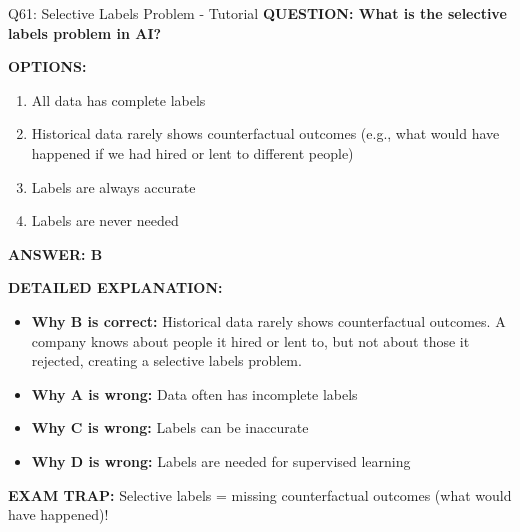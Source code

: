 \documentclass[8pt]{beamer}
\begin{document}
	\begin{frame}{Q61: Selective Labels Problem - Tutorial}
		\fontsize{6.5}{7.5}\selectfont
		\textbf{QUESTION: What is the selective labels problem in AI?}
		
		\vspace{0.1cm}
		\textbf{OPTIONS:}
		\begin{enumerate}
			\item All data has complete labels
			\item Historical data rarely shows counterfactual outcomes (e.g., what would have happened if we had hired or lent to different people)
			\item Labels are always accurate
			\item Labels are never needed
		\end{enumerate}
		
		\vspace{0.1cm}
		\textcolor{myblue}{\textbf{ANSWER: B}}
		
		\vspace{0.1cm}
		\textbf{DETAILED EXPLANATION:}
		\begin{itemize}
			\item \textbf{Why B is correct:} Historical data rarely shows counterfactual outcomes. A company knows about people it hired or lent to, but not about those it rejected, creating a selective labels problem.
			\item \textbf{Why A is wrong:} Data often has incomplete labels
			\item \textbf{Why C is wrong:} Labels can be inaccurate
			\item \textbf{Why D is wrong:} Labels are needed for supervised learning
		\end{itemize}
		
		\textcolor{myred}{\textbf{EXAM TRAP:}} Selective labels = \textcolor{myblue}{missing counterfactual outcomes} (what would have happened)!
	\end{frame}
	
\end{document}
